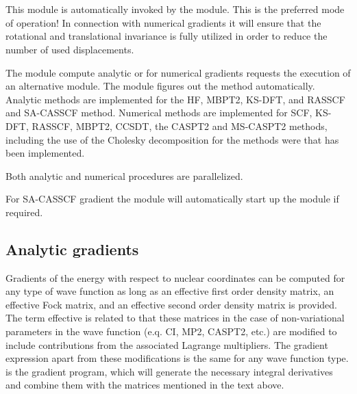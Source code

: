 
\section{}
\label{UG:sec:alaska}

This module is automatically invoked by the  module.
This is the preferred mode of operation! In connection with numerical gradients
it will ensure that the rotational and translational invariance is fully
utilized in order to reduce the number of used displacements.

The   module compute analytic or for numerical gradients requests the execution of
an alternative module.
The  module figures out
the method automatically. Analytic methods are implemented for the HF, MBPT2, KS-DFT, and
RASSCF and SA-CASSCF method. Numerical methods are implemented for SCF, KS-DFT, RASSCF,
MBPT2, CCSDT, the CASPT2 and MS-CASPT2 methods, including the use of the Cholesky
decomposition for the methods were that has been implemented.

Both analytic and numerical procedures are parallelized.

For SA-CASSCF gradient the  module will automatically
start up the  module if required.

\subsection{Analytic gradients}
Gradients of the energy with respect to nuclear coordinates can be computed for
any type of wave function as long as an effective first order density matrix, an
effective Fock matrix, and an effective second order density matrix is provided.
The term effective is related to that
these matrices in the case of non-variational parameters in the wave function
(e.q. CI, MP2, CASPT2, etc.) are modified to include contributions from
the associated Lagrange
multipliers. The gradient expression apart from these modifications is
the same for any wave function type. 
is the gradient program, which will generate
the necessary integral derivatives and combine them with the matrices
mentioned in the text above.

